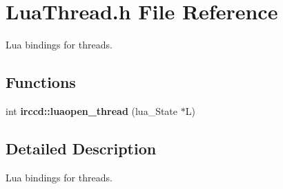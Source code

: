 \hypertarget{a00109}{\section{Lua\-Thread.\-h File Reference}
\label{a00109}
}


Lua bindings for threads.  


\subsection*{Functions}
\begin{DoxyCompactItemize}
\item 
int {\bfseries irccd\-::luaopen\-\_\-thread} (lua\-\_\-\-State $\ast$L)
\end{DoxyCompactItemize}


\subsection{Detailed Description}
Lua bindings for threads. 